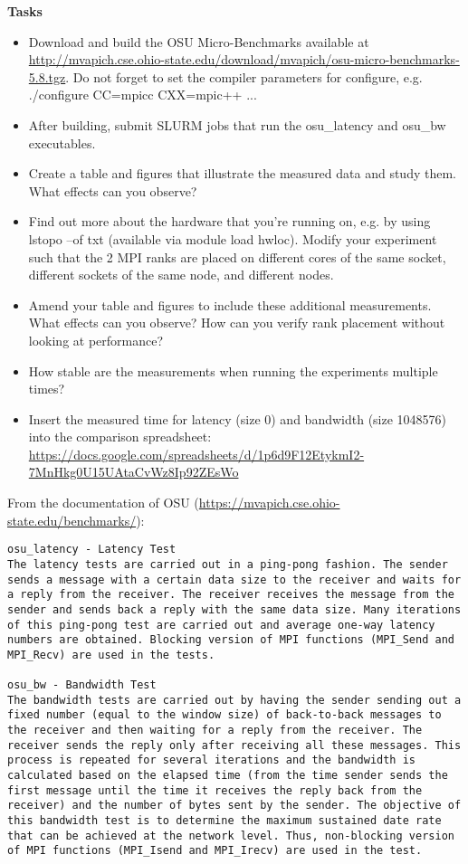 \documentclass[UTF-8]{article}
\begin{document}
    \textbf{Tasks}
    \begin{itemize}
    	\item Download and build the OSU Micro-Benchmarks available at \url{http://mvapich.cse.ohio-state.edu/download/mvapich/osu-micro-benchmarks-5.8.tgz}. Do not forget to set the compiler parameters for configure, e.g. ./configure CC=mpicc CXX=mpic++ ...
    	\item After building, submit SLURM jobs that run the osu\_latency and osu\_bw executables.
    	\item Create a table and figures that illustrate the measured data and study them. What effects can you observe?
    	\item Find out more about the hardware that you're running on, e.g. by using lstopo --of txt (available via module load hwloc). Modify your experiment such that the 2 MPI ranks are placed on
    	different cores of the same socket,
    	different sockets of the same node, and
    	different nodes.
    	\item Amend your table and figures to include these additional measurements. What effects can you observe? How can you verify rank placement without looking at performance?
    	\item How stable are the measurements when running the experiments multiple times?
    	\item Insert the measured time for latency (size 0) and bandwidth (size 1048576) into the comparison spreadsheet: \url{https://docs.google.com/spreadsheets/d/1p6d9F12EtykmI2-7MnHkg0U15UAtaCvWz8Ip92ZEsWo}
    \end{itemize}
    
    From the documentation of OSU (\url{https://mvapich.cse.ohio-state.edu/benchmarks/}):
    \begin{lstlisting}
osu_latency - Latency Test
The latency tests are carried out in a ping-pong fashion. The sender sends a message with a certain data size to the receiver and waits for a reply from the receiver. The receiver receives the message from the sender and sends back a reply with the same data size. Many iterations of this ping-pong test are carried out and average one-way latency numbers are obtained. Blocking version of MPI functions (MPI_Send and MPI_Recv) are used in the tests. 

osu_bw - Bandwidth Test
The bandwidth tests are carried out by having the sender sending out a fixed number (equal to the window size) of back-to-back messages to the receiver and then waiting for a reply from the receiver. The receiver sends the reply only after receiving all these messages. This process is repeated for several iterations and the bandwidth is calculated based on the elapsed time (from the time sender sends the first message until the time it receives the reply back from the receiver) and the number of bytes sent by the sender. The objective of this bandwidth test is to determine the maximum sustained date rate that can be achieved at the network level. Thus, non-blocking version of MPI functions (MPI_Isend and MPI_Irecv) are used in the test. 
\end{lstlisting}
    
\end{document}
